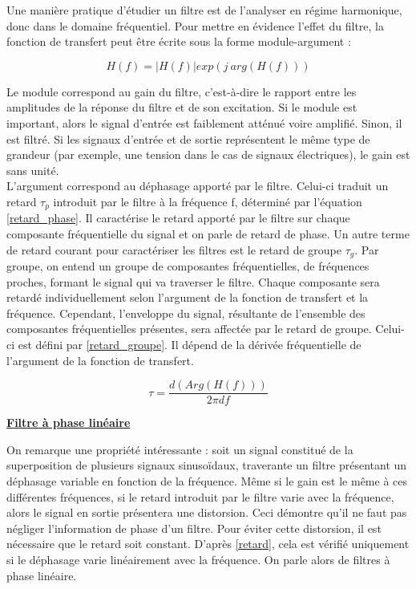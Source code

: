 	Une manière pratique d'étudier un filtre est de l'analyser en régime harmonique, donc dans le domaine fréquentiel. Pour mettre en évidence l'effet du filtre, la fonction de transfert peut être écrite sous la forme module-argument :
	
	\begin{equation}\label{key}
	H(f) = |H(f)|exp(j~arg(H(f)))
	\end{equation}
	
	 Le module correspond au gain du filtre, c'est-à-dire le rapport entre les amplitudes de la réponse du filtre et de son excitation. Si le module est important, alors le signal d'entrée est faiblement atténué voire amplifié. Sinon, il est filtré.
	Si les signaux d'entrée et de sortie représentent le même type de grandeur (par exemple, une tension dans le cas de signaux électriques), le gain est sans unité.\\ 
	
	L'argument correspond au déphasage apporté par le filtre. Celui-ci traduit un retard $ \tau_p $ introduit par le filtre à la fréquence f, déterminé par l'équation \ref{retard_phase}.	Il caractérise le retard apporté par le filtre sur chaque composante fréquentielle du signal et on parle de retard de phase. Un autre terme de retard courant pour caractériser les filtres est le retard de groupe $ \tau_g $. Par groupe, on entend un groupe de composantes fréquentielles, de fréquences proches, formant le signal qui va traverser le filtre. Chaque composante sera retardé individuellement selon l'argument de la fonction de transfert et la fréquence. Cependant, l'enveloppe du signal, résultante de l'ensemble des composantes fréquentielles présentes, sera affectée par le retard de groupe. Celui-ci est défini par \ref{retard_groupe}. Il dépend de la dérivée fréquentielle de l'argument de la fonction de transfert.  
	
	\begin{equation}\label{retard}
	\tau = \frac{d(Arg(H(f)))}{2\pi df}
	\end{equation}
	
	\vspace{1\baselineskip}
	
	\underline{\textbf{Filtre à phase linéaire}}
	
	On remarque une propriété intéressante : soit un signal constitué de la superposition de plusieurs signaux sinusoïdaux, traverante un filtre présentant un déphasage variable en fonction de la fréquence. Même si le gain est le même à ces différentes fréquences, si le retard introduit par le filtre varie avec la fréquence, alors le signal en sortie présentera une distorsion. Ceci démontre qu'il ne faut pas négliger l'information de phase d'un filtre.
	Pour éviter cette distorsion, il est nécessaire que le retard soit constant. D'après \ref{retard}, cela est vérifié uniquement si le déphasage varie linéairement avec la fréquence. On parle alors de filtres à phase linéaire.
	
